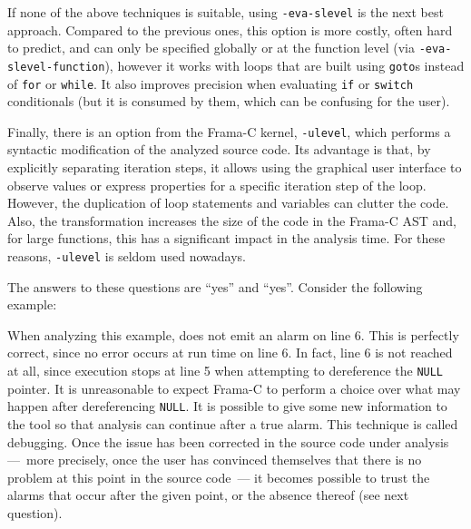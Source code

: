 \documentclass{frama-c-book}
\begin{document}
If none of the above techniques is suitable, using \lstinline|-eva-slevel|
is the next best approach. Compared to the previous ones, this option is more
costly, often hard to predict, and can only be specified globally or at the
function level (via \lstinline|-eva-slevel-function|), however it works with
loops that are built using \lstinline|goto|s instead of \lstinline|for| or
\lstinline|while|. It also improves precision when evaluating \lstinline|if| or
\lstinline|switch| conditionals (but it is consumed by them, which can be
confusing for the user).

Finally, there is an option from the Frama-C kernel, \lstinline|-ulevel|,
which performs a syntactic modification of the analyzed source code.
Its advantage is that, by explicitly separating iteration steps,
it allows using the graphical user interface to observe values or express
properties for a specific iteration step of the loop.
However, the duplication of loop statements and variables can clutter the code.
Also, the transformation increases the size of the code in the Frama-C AST and,
for large functions, this has a significant impact in the analysis time.
For these reasons, \lstinline|-ulevel| is seldom used nowadays.



The answers to these questions are ``yes'' and ``yes''.
Consider the following example:


When analyzing this example, \Eva{} does not emit an
alarm on line 6. This is perfectly correct, since no error occurs at
run time on line 6. In fact, line 6 is not reached at all, since
execution stops at line 5 when attempting to dereference
the \lstinline|NULL| pointer. It is unreasonable to expect Frama-C to
perform a choice over what may happen after dereferencing
\lstinline|NULL|. It is possible to give some new information to the tool
so that analysis can continue after a true alarm. This technique is called
debugging. Once the issue has been corrected in the source code under
analysis ---~more precisely, once the user has convinced themselves
that there is no problem at this point in the source code~--- it
becomes possible to trust the alarms that occur after the given point,
or the absence thereof (see next question).

\end{document}
